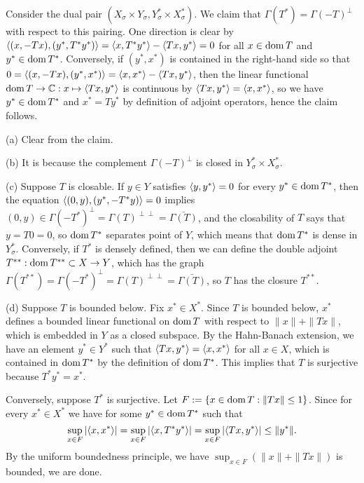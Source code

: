 \documentclass{../../large}
\begin{document}
\begin{pf}
Consider the dual pair $(X_\sigma\times Y_\sigma,Y_\sigma^*\times X_\sigma^*)$.
We claim that $\Gamma(T^*)=\Gamma(-T)^\perp$ with respect to this pairing.
One direction is clear by $\langle(x,-Tx),(y^*,T^*y^*)\rangle=\langle x,T^*y^*\rangle-\langle Tx,y^*\rangle=0$ for all $x\in\operatorname{dom} T$ and $y^*\in\operatorname{dom} T^*$.
Conversely, if $(y^*,x^*)$ is contained in the right-hand side so that $0=\langle(x,-Tx),(y^*,x^*)\rangle=\langle x,x^*\rangle-\langle Tx,y^*\rangle$, then the linear functional $\operatorname{dom} T\to\mathbb{C}:x\mapsto\langle Tx,y^*\rangle$ is continuous by $\langle Tx,y^*\rangle=\langle x,x^*\rangle$, so we have $y^*\in\operatorname{dom} T^*$ and $x^*=Ty^*$ by definition of adjoint operators, hence the claim follows.

(a) Clear from the claim.

(b) It is because the complement $\Gamma(-T)^\perp$ is closed in $Y^*_\sigma\times X^*_\sigma$.

(c)
Suppose $T$ is closable.
If $y\in Y$ satisfies $\langle y,y^*\rangle=0$ for every $y^*\in\operatorname{dom} T^*$, then the equation $\langle(0,y),(y^*,-T^*y)\rangle=0$ implies $(0,y)\in\Gamma(-T^*)^\perp=\Gamma(T)^{\perp\perp}=\bar{\Gamma(T)}$, and the closability of $T$ says that $y=T0=0$, so $\operatorname{dom} T^*$ separates point of $Y$, which means that $\operatorname{dom} T^*$ is dense in $Y^*_\sigma$.
Conversely, if $T^*$ is densely defined, then we can define the double adjoint $T^{**}:\operatorname{dom} T^{**}\subset X\to Y$, which has the graph $\Gamma(T^{**})=\Gamma(-T^*)^\perp=\Gamma(T)^{\perp\perp}=\bar{\Gamma(T)}$, so $T$ has the closure $T^{**}$.

(d)
Suppose $T$ is bounded below.
Fix $x^*\in X^*$.
Since $T$ is bounded below, $x^*$ defines a bounded linear functional on $\operatorname{dom} T$ with respect to $\|x\|+\|Tx\|$, which is embedded in $Y$ as a closed subspace.
By the Hahn-Banach extension, we have an element $y^*\in Y^*$ such that $\langle Tx,y^*\rangle=\langle x,x^*\rangle$ for all $x\in X$, which is contained in $\operatorname{dom} T^*$ by the definition of $\operatorname{dom} T^*$.
This implies that $T$ is surjective because $T^*y^*=x^*$.

Conversely, suppose $T^*$ is surjective.
Let $F:=\{x\in\operatorname{dom} T:\|Tx\|\le1\}$.
Since for every $x^*\in X^*$ we have for some $y^*\in\operatorname{dom} T^*$ such that
\[\sup_{x\in F}|\langle x,x^*\rangle|=\sup_{x\in F}|\langle x,T^*y^*\rangle|=\sup_{x\in F}|\langle Tx,y^*\rangle|\le\|y^*\|.\]
By the uniform boundedness principle, we have $\sup_{x\in F}(\|x\|+\|Tx\|)$ is bounded, we are done.
\end{pf}

\begin{prb}[Cores]
\end{prb}
\end{document}
